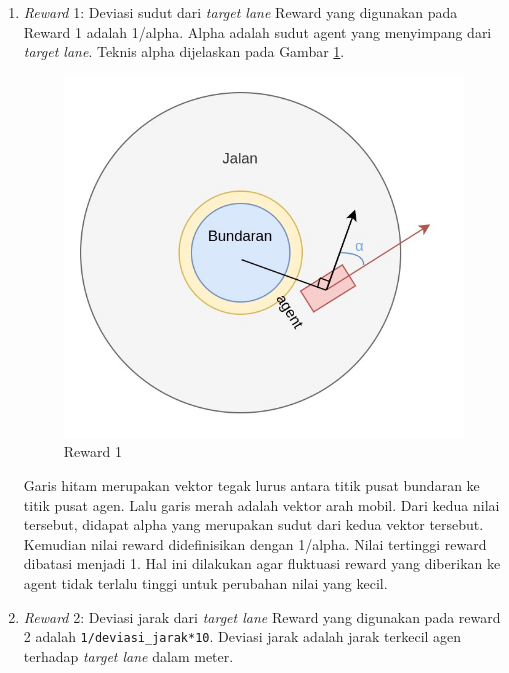 \documentclass[conference]{IEEEtran}
\begin{document}
\begin{enumerate}
\item \textit{Reward} 1: Deviasi sudut dari \textit{target lane}
Reward yang digunakan pada Reward 1 adalah 1/alpha. Alpha adalah sudut agent yang menyimpang dari \textit{target lane}. Teknis alpha dijelaskan pada Gambar \ref{fig:reward_anglediff_sketch}. 

\begin{figure}[H] 
	\centering
	\includegraphics[width=1\linewidth]{images/reward_anglediff_sketch}
	\caption{Reward 1}
	\label{fig:reward_anglediff_sketch}
\end{figure}

Garis hitam merupakan vektor tegak lurus antara titik pusat bundaran ke titik pusat agen. Lalu garis merah adalah vektor arah mobil. Dari kedua nilai tersebut, didapat alpha yang merupakan sudut dari kedua vektor tersebut. Kemudian nilai reward didefinisikan dengan 1/alpha. Nilai tertinggi reward dibatasi menjadi 1. Hal ini dilakukan agar fluktuasi reward yang diberikan ke agent tidak terlalu tinggi untuk perubahan nilai yang kecil.


\item{\textit{Reward} 2: Deviasi jarak dari \textit{target lane}}
Reward yang digunakan pada reward 2 adalah \verb=1/deviasi_jarak*10=. Deviasi jarak adalah jarak terkecil agen terhadap \textit{target lane} dalam meter.


\end{enumerate}
\end{document}
